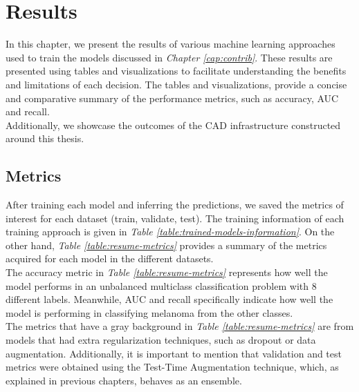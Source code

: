 \chapter{Results}
\label{cap:result}

In this chapter, we present the results of various machine learning
approaches used to train the models discussed in \textit{Chapter \ref{cap:contrib}}.
These results are presented using tables and visualizations to
facilitate understanding the benefits and limitations of each decision. The tables and visualizations,
provide a concise and comparative summary of the performance metrics, such as accuracy, AUC and recall. \\

Additionally, we showcase the outcomes of the CAD infrastructure constructed around this thesis.


\section{Metrics}

After training each model and inferring the predictions,
we saved the metrics of interest for each dataset (train, validate, test).
The training information of each training approach is given in \textit{Table \ref{table:trained-models-information}}.
On the other hand, \textit{Table \ref{table:resume-metrics}} provides a summary of the metrics acquired for each model in the different datasets. \\

The accuracy metric in \textit{Table \ref{table:resume-metrics}} represents how well
the model performs in an unbalanced multiclass classification problem with 8 different labels.
Meanwhile, AUC and recall specifically indicate how well the model is performing
in classifying melanoma from the other classes. \\


The metrics that have a gray background in \textit{Table \ref{table:resume-metrics}} are from models that had extra regularization techniques,
such as dropout or data augmentation. Additionally, it is important to
mention that validation and test metrics were obtained using the Test-Time Augmentation technique,
which, as explained in previous chapters, behaves as an ensemble.

\newpage

